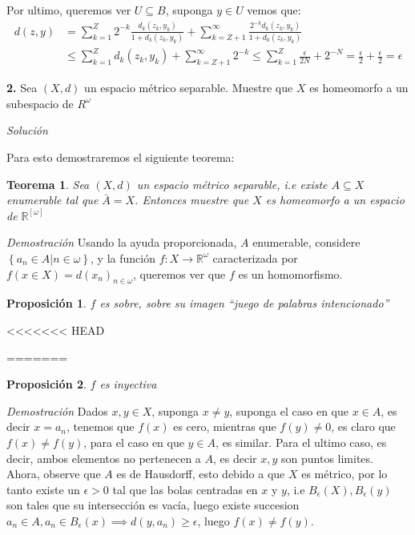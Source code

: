 \documentclass[]{article}
\newtheorem{thm}{Teorema}
\newtheorem{prop}{Proposición}
\newcommand{\set}[1]{\left\lbrace #1 \right\rbrace}
\newcommand{\RR}{\mathbb{R}}
\newcommand{\function}[3]{#1 : #2 \rightarrow #3}
\newcommand{\contained}{\subseteq}
\begin{document}
Por ultimo, queremos ver $ U \contained B $, suponga $ y \in U $ vemos que:
\begin{align*}
d(z,y) &= \sum_{k=1}^{Z}2^{-k}\frac{d_k(z_k,y_k)}{1+d_k(z_k,y_k)} + \sum_{k = Z+1}^{\infty}\frac{2^{-k}d_k(z_k,y_k)}{1+d_k(z_k,y_k)} \\
&\leq \sum_{k =1}^{Z} d_k(z_k,y_k) + \sum_{k = Z+1}^{\infty}2^{-k} \leq \sum_{k=1}^{Z}\frac{\epsilon}{2N} + 2^{-N} = \frac{\epsilon}{2} + \frac{\epsilon}{2} = \epsilon
\end{align*}

\textbf{2.} Sea $ (X,d) $ un espacio métrico separable. Muestre que $ X $ es homeomorfo a un subespacio de $ R^{\omega} $

\emph{Solución}

Para esto demostraremos el siguiente teorema:

\begin{thm}
	Sea $ (X,d) $ un espacio métrico separable, i.e existe $ A \contained X $ enumerable tal que $ \bar{A} = X $. Entonces muestre que $ X $ es homeomorfo a un espacio de $ \RR^[\omega] $
	
\end{thm}

\textit{Demostración} Usando la ayuda proporcionada, $A$ enumerable, considere $ \set{a_n \in A | n \in \omega} $, y la función $ \function{f}{X}{\RR^{\omega}} $ caracterizada por $ f(x \in X) = d(x_n)_{n \in \omega} $, queremos ver que $f$ es un homomorfismo.

\begin{prop}
	$f$ es sobre, sobre su imagen \emph{``juego de palabras intencionado''}
\end{prop}

<<<<<<< HEAD

 
=======
\begin{prop}
	$f$ es inyectiva
\end{prop}
 
 \textit{Demostración} Dados $ x,y \in X $, suponga $ x \neq y $, suponga el caso en que $ x \in A $, es decir $ x = a_n $, tenemos que $ f(x) $ es cero, mientras que $ f(y) \neq 0$, es claro que $ f(x) \neq f(y) $, para el caso en que $ y \in A$, es similar. Para el ultimo caso, es decir, ambos elementos no pertenecen a $A$, es decir $ x,y $ son puntos limites. Ahora, observe que $A$ es de Hausdorff, esto debido a que $X$ es métrico, por lo tanto existe un $ \epsilon>0 $ tal que las bolas centradas en $x$ y $y$, i.e $ B_\epsilon(X), B_\epsilon(y) $ son tales que su intersección es vacía, luego existe succesion $ a_n \in A, a_n \in B_{\epsilon}(x) \implies d(y,a_n) \geq \epsilon$, luego $ f(x) \neq f(y) $.
 
\end{document}
